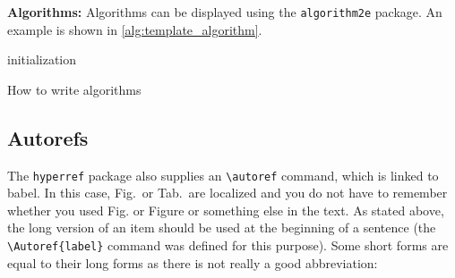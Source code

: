 \textbf{Algorithms:} Algorithms can be displayed using the \verb+algorithm2e+ package. An example is shown in \autoref{alg:template_algorithm}.\\
\begin{algorithm}[tbh]
	\SetAlgoLined
	initialization\;
	\caption{How to write algorithms}\label{alg:template_algorithm}
\end{algorithm}
\subsection{Autorefs}\label{subsec:autorefs}
The \verb+hyperref+ package also supplies an \verb+\autoref+ command, which is linked to babel. In this case, Fig.~or Tab.~are localized and you do not have to remember whether you used Fig. or Figure or something else in the text. As stated above, the long version of an item should be used at the beginning of a sentence (the \verb+\Autoref{label}+ command was defined for this purpose). Some short forms are equal to their long forms as there is not really a good abbreviation:
